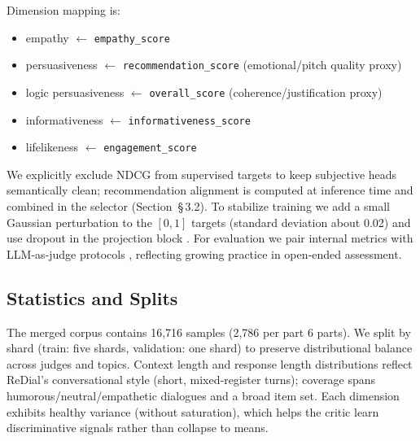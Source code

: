 \documentclass[12pt]{article}
\begin{document}
  Dimension mapping is:
  \begin{itemize}[leftmargin=*]
    \item empathy \(\leftarrow\) \texttt{empathy\_score}
    \item persuasiveness \(\leftarrow\) \texttt{recommendation\_score} (emotional/pitch quality proxy)
    \item logic persuasiveness \(\leftarrow\) \texttt{overall\_score} (coherence/justification proxy)
    \item informativeness \(\leftarrow\) \texttt{informativeness\_score}
    \item lifelikeness \(\leftarrow\) \texttt{engagement\_score}
  \end{itemize}
  We explicitly exclude NDCG from supervised targets to keep subjective heads semantically clean; recommendation alignment is computed at inference time and combined in the selector (Section~\S\,3.2). To stabilize training we add a small Gaussian perturbation to the \([0,1]\) targets (standard deviation about 0.02) and use dropout in the projection block \citep{muller2019label_smoothing,srivastava2014dropout}. For evaluation we pair internal metrics with LLM‑as‑judge protocols \citep{yan2023llmjudge,evidently_llm_judge}, reflecting growing practice in open‑ended assessment.
  
  \subsection{Statistics and Splits}
  The merged corpus contains 16{,}716 samples (2{,}786 per part \texttimes{} 6 parts). We split by shard (train: five shards, validation: one shard) to preserve distributional balance across judges and topics. Context length and response length distributions reflect ReDial's conversational style (short, mixed‑register turns); coverage spans humorous/neutral/empathetic dialogues and a broad item set. Each dimension exhibits healthy variance (without saturation), which helps the critic learn discriminative signals rather than collapse to means.
  
\end{document}
